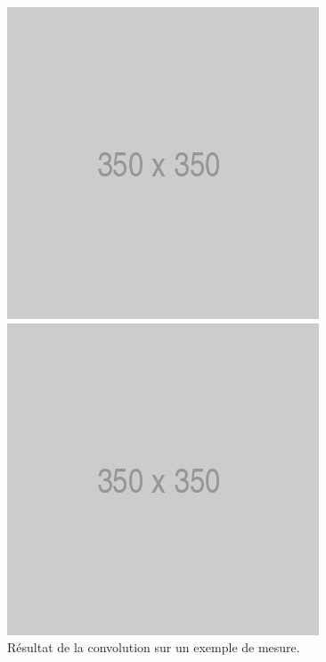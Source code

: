 \begin{figure}[htp]
  \centering
  \begin{minipage}{0.4\textwidth}
    \centering
    \includegraphics[width=\linewidth]{images/placeholder.png}
  \end{minipage}
  \begin{minipage}{0.4\textwidth}
    \centering
    \includegraphics[width=\linewidth]{images/placeholder.png}
  \end{minipage}
  \caption{Résultat de la convolution sur un exemple de mesure.}
  \label{fig:step_result}
\end{figure}

